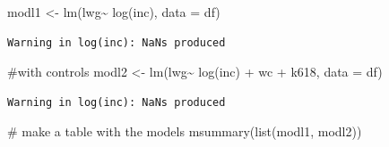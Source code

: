 \documentclass[
  letterpaper,
  DIV=11,
  numbers=noendperiod]{scrartcl}
\newenvironment{Shaded}{\begin{snugshade}}{\end{snugshade}}
\newcommand{\AttributeTok}[1]{\textcolor[rgb]{0.40,0.45,0.13}{#1}}
\newcommand{\CommentTok}[1]{\textcolor[rgb]{0.37,0.37,0.37}{#1}}
\newcommand{\FunctionTok}[1]{\textcolor[rgb]{0.28,0.35,0.67}{#1}}
\newcommand{\NormalTok}[1]{\textcolor[rgb]{0.00,0.23,0.31}{#1}}
\newcommand{\OtherTok}[1]{\textcolor[rgb]{0.00,0.23,0.31}{#1}}
\newcommand{\SpecialCharTok}[1]{\textcolor[rgb]{0.37,0.37,0.37}{#1}}
\begin{document}
\begin{Shaded}
\begin{Highlighting}[]
\NormalTok{modl1 }\OtherTok{\textless{}{-}} \FunctionTok{lm}\NormalTok{(lwg}\SpecialCharTok{\textasciitilde{}} \FunctionTok{log}\NormalTok{(inc), }\AttributeTok{data =}\NormalTok{ df)}
\end{Highlighting}
\end{Shaded}

\begin{verbatim}
Warning in log(inc): NaNs produced
\end{verbatim}

\begin{Shaded}
\begin{Highlighting}[]
\CommentTok{\#with controls}
\NormalTok{modl2 }\OtherTok{\textless{}{-}} \FunctionTok{lm}\NormalTok{(lwg}\SpecialCharTok{\textasciitilde{}} \FunctionTok{log}\NormalTok{(inc) }\SpecialCharTok{+}\NormalTok{ wc }\SpecialCharTok{+}\NormalTok{ k618, }\AttributeTok{data =}\NormalTok{ df)}
\end{Highlighting}
\end{Shaded}

\begin{verbatim}
Warning in log(inc): NaNs produced
\end{verbatim}

\begin{Shaded}
\begin{Highlighting}[]
\CommentTok{\# make a table with the models}
\FunctionTok{msummary}\NormalTok{(}\FunctionTok{list}\NormalTok{(modl1, modl2))}
\end{Highlighting}
\end{Shaded}
\end{document}
